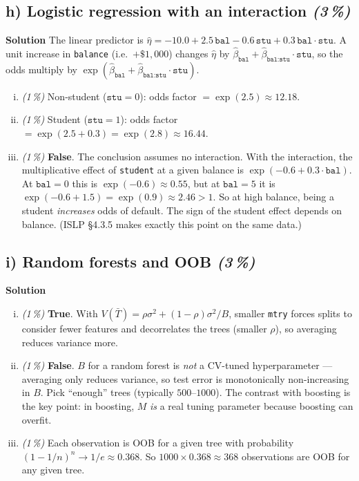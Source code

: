 \documentclass[11pt,a4paper]{article}
\newcommand{\subpoints}[1]{\textit{(#1\,\%)}}
\newcommand{\sol}{\noindent\textbf{Solution}}
\begin{document}
\subsection*{h) Logistic regression with an interaction \subpoints{3}}

\sol{} The linear predictor is
$\hat\eta = -10.0 + 2.5\,\texttt{bal} - 0.6\,\texttt{stu} + 0.3\,\texttt{bal}\cdot\texttt{stu}$.
A unit increase in \texttt{balance} (i.e.\ $+\$1{,}000$) changes $\hat\eta$ by
$\hat\beta_{\texttt{bal}} + \hat\beta_{\texttt{bal:stu}}\cdot\texttt{stu}$, so the odds multiply by
$\exp(\hat\beta_{\texttt{bal}} + \hat\beta_{\texttt{bal:stu}}\cdot\texttt{stu})$.

\begin{enumerate}[(i)]
  \item \subpoints{1} Non-student ($\texttt{stu}=0$):
        odds factor $= \exp(2.5) \approx \boxed{12.18}$.
  \item \subpoints{1} Student ($\texttt{stu}=1$):
        odds factor $= \exp(2.5 + 0.3) = \exp(2.8) \approx \boxed{16.44}$.
  \item \subpoints{1} \textbf{False}. The conclusion assumes no interaction. With the interaction,
        the multiplicative effect of \texttt{student} at a given balance is
        $\exp(-0.6 + 0.3\cdot\texttt{bal})$. At $\texttt{bal}=0$ this is $\exp(-0.6)\approx 0.55$,
        but at $\texttt{bal}=5$ it is $\exp(-0.6 + 1.5) = \exp(0.9) \approx 2.46 > 1$. So at high
        balance, being a student \emph{increases} odds of default. The sign of the
        student effect depends on balance. (ISLP \S4.3.5 makes exactly this point on the same data.)
\end{enumerate}

\subsection*{i) Random forests and OOB \subpoints{3}}

\sol{}
\begin{enumerate}[(i)]
  \item \subpoints{1} \textbf{True}. With $V(\bar T) = \rho\sigma^2 + (1-\rho)\sigma^2/B$, smaller
        \texttt{mtry} forces splits to consider fewer features and decorrelates the trees (smaller
        $\rho$), so averaging reduces variance more.
  \item \subpoints{1} \textbf{False}. $B$ for a random forest is \emph{not} a CV-tuned
        hyperparameter --- averaging only reduces variance, so test error is monotonically
        non-increasing in $B$. Pick ``enough'' trees (typically $500$--$1000$). The contrast with
        boosting is the key point: in boosting, $M$ \emph{is} a real tuning parameter because
        boosting can overfit.
  \item \subpoints{1} Each observation is OOB for a given tree with probability
        $(1 - 1/n)^n \to 1/e \approx 0.368$. So
        $1000 \times 0.368 \approx \boxed{368}$ observations are OOB for any given tree.
\end{enumerate}
\end{document}
